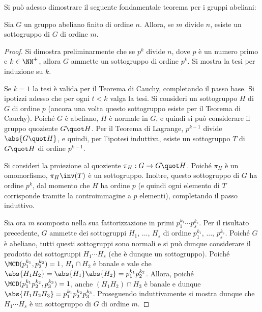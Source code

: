 \documentclass[12pt]{scrartcl}
\begin{document}
	Si può adesso dimostrare il seguente fondamentale
	teorema per i gruppi abeliani:
	
	\begin{theorem}
		Sia $G$ un gruppo abeliano finito di ordine $n$.
		Allora, se $m$ divide $n$, esiste un sottogruppo di
		$G$ di ordine $m$.
	\end{theorem}

	\begin{proof}
		Si dimostra preliminarmente che se $p^k$ divide $n$,
		dove $p$ è un numero primo e $k \in \NN^+$, allora
		$G$ ammette un sottogruppo di ordine $p^k$. Si
		mostra la tesi per induzione su $k$. \medskip
		
		
		Se $k=1$ la tesi è valida per il Teorema di Cauchy, completando il passo base. Si ipotizzi adesso
		che per ogni $t < k$ valga la tesi. Si consideri
		un sottogruppo $H$ di $G$ di ordine $p$
		(ancora una volta questo sottogruppo esiste per il
		Teorema di Cauchy). Poiché $G$ è abeliano, $H$ è
		normale in $G$, e quindi si può considerare il
		gruppo quoziente $G \quot H$. Per il Teorema di
		Lagrange, $p^{k-1}$ divide $\abs{G \quot H}$, e
		quindi, per l'ipotesi induttiva, esiste un sottogruppo
		$T$ di $G \quot H$ di ordine $p^{k-1}$. \medskip
		
		
		Si consideri la proiezione al quoziente $\pi_H : G \to G \quot H$. Poiché $\pi_H$ è un omomorfismo,
		$\pi_H\inv(T)$ è un sottogruppo. Inoltre, questo sottogruppo di $G$ ha ordine $p^k$, dal momento che $H$ ha ordine $p$
		(e quindi ogni elemento di $T$ corrisponde tramite
		la controimmagine a $p$ elementi), completando il passo
		induttivo. \medskip
		
		
		Sia ora $m$ scomposto nella sua fattorizzazione in primi
		$p_1^{k_1} \cdots p_s^{k_s}$. Per il risultato precedente,
		$G$ ammette dei sottogruppi $H_1$, ..., $H_s$ di ordine
		$p_1^{k_1}$, ..., $p_s^{k_s}$. Poiché $G$ è abeliano,
		tutti questi sottogruppi sono normali e si può dunque
		considerare il prodotto dei sottogruppi $H_1 \cdots H_s$
		(che è dunque un sottogruppo). Poiché
		$\MCD(p_1^{k_1}, p_2^{k_2})=1$, $H_1 \cap H_2$ è banale e vale
		che $\abs{H_1 H_2} = \abs{H_1} \abs{H_2} = p_1^{k_1} p_2^{k_2}$.
		Allora, poiché $\MCD(p_1^{k_1} p_2^{k_2}, p_3^{k_3}) = 1$, anche $(H_1H_2) \cap H_3$ è banale e dunque $\abs{H_1 H_2 H_3} =
		p_1^{k_1} p_2^{k_2} p_3^{k_3}$. Proseguendo induttivamente
		si mostra dunque che $H_1 \cdots H_s$ è un sottogruppo
		di $G$ di ordine $m$.
	\end{proof}
\end{document}
